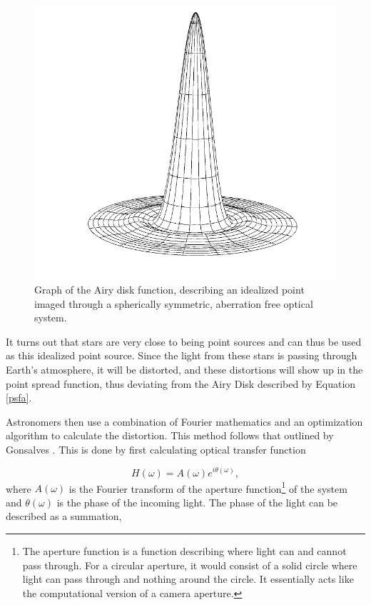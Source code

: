 \begin{figure}[h]
  \centering
  \includegraphics[scale = .4]{Images/airydisk.png}
  \caption{Graph of the Airy disk function, describing an idealized point imaged through a spherically symmetric, aberration free optical system.}
  \label{fig:airydiska}
\end{figure}

It turns out that stars are very close to being point sources and can thus be used as this idealized point source. Since the light from these stars is passing through Earth's atmosphere, it will be distorted, and these distortions will show up in the point spread function, thus deviating from the Airy Disk described by Equation \ref{psfa}. 

Astronomers then use a combination of Fourier mathematics and an optimization algorithm to calculate the distortion. This method follows that outlined by Gonsalves \cite{Gonsalves1982}. This is done by first calculating optical transfer function

\begin{equation}
  H(\omega) = A(\omega) e^{i \theta(\omega)},
  \label{opticaltransfera}
\end{equation}
%
where $A(\omega)$ is the Fourier transform of the aperture function\footnote{The aperture function is a function describing where light can and cannot pass through. For a circular aperture, it would consist of a solid circle where light can pass through and nothing around the circle. It essentially acts like the computational version of a camera aperture.} of the system and $\theta(\omega)$ is the phase of the incoming light. The phase of the light can be described as a summation,


